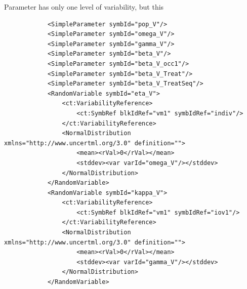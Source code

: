 Parameter  has only one level of variability, but this 
\lstset{language=XML}
\begin{lstlisting}
            <SimpleParameter symbId="pop_V"/>
            <SimpleParameter symbId="omega_V"/>
            <SimpleParameter symbId="gamma_V"/>
            <SimpleParameter symbId="beta_V"/>
            <SimpleParameter symbId="beta_V_occ1"/>
            <SimpleParameter symbId="beta_V_Treat"/>
            <SimpleParameter symbId="beta_V_TreatSeq"/>
            <RandomVariable symbId="eta_V">
                <ct:VariabilityReference>
                    <ct:SymbRef blkIdRef="vm1" symbIdRef="indiv"/>
                </ct:VariabilityReference>
                <NormalDistribution xmlns="http://www.uncertml.org/3.0" definition="">
                    <mean><rVal>0</rVal></mean>
                    <stddev><var varId="omega_V"/></stddev>
                </NormalDistribution>
            </RandomVariable>
            <RandomVariable symbId="kappa_V">
                <ct:VariabilityReference>
                    <ct:SymbRef blkIdRef="vm1" symbIdRef="iov1"/>
                </ct:VariabilityReference>
                <NormalDistribution xmlns="http://www.uncertml.org/3.0" definition="">
                    <mean><rVal>0</rVal></mean>
                    <stddev><var varId="gamma_V"/></stddev>
                </NormalDistribution>
            </RandomVariable>
\end{lstlisting}

